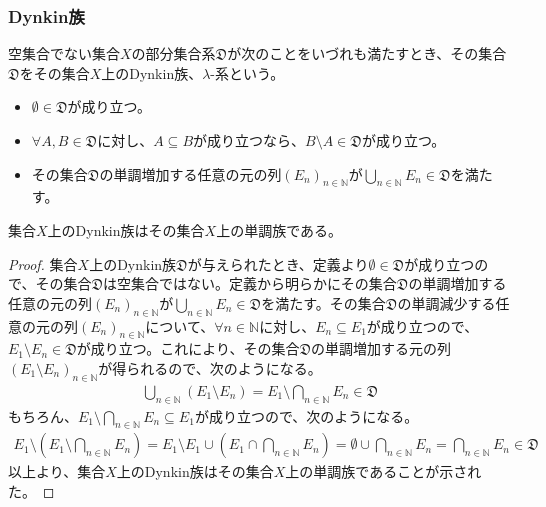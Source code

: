 \documentclass[dvipdfmx]{jsarticle}
\begin{document}
\subsubsection{Dynkin族}%
\begin{axs}[Dynkin族の公理]
空集合でない集合$X$の部分集合系$\mathfrak{D}$が次のことをいづれも満たすとき、その集合$\mathfrak{D}$をその集合$X$上のDynkin族、$\lambda$-系という。
\begin{itemize}
\item
  $\mathfrak{\emptyset \in D}$が成り立つ。
\item
  $\forall A,B\in \mathfrak{D}$に対し、$A \subseteq B$が成り立つなら、$B \setminus A\in \mathfrak{D}$が成り立つ。
\item
  その集合$\mathfrak{D}$の単調増加する任意の元の列$\left( E_{n} \right)_{n \in \mathbb{N}}$が$\bigcup_{n \in \mathbb{N}} E_{n} \in \mathfrak{D}$を満たす。
\end{itemize}
\end{axs}
\begin{thm}\label{4.5.6.9} 集合$X$上のDynkin族はその集合$X$上の単調族である。
\end{thm}
\begin{proof}
集合$X$上のDynkin族$\mathfrak{D}$が与えられたとき、定義より$\mathfrak{\emptyset \in D}$が成り立つので、その集合$\mathfrak{D}$は空集合ではない。定義から明らかにその集合$\mathfrak{D}$の単調増加する任意の元の列$\left( E_{n} \right)_{n \in \mathbb{N}}$が$\bigcup_{n \in \mathbb{N}} E_{n}\in \mathfrak{D}$を満たす。その集合$\mathfrak{D}$の単調減少する任意の元の列$\left( E_{n} \right)_{n \in \mathbb{N}}$について、$\forall n \in \mathbb{N}$に対し、$E_{n} \subseteq E_{1}$が成り立つので、$E_{1} \setminus E_{n}\in \mathfrak{D}$が成り立つ。これにより、その集合$\mathfrak{D}$の単調増加する元の列$\left( E_{1} \setminus E_{n} \right)_{n \in \mathbb{N}}$が得られるので、次のようになる。
\begin{align*}
\bigcup_{n \in \mathbb{N}} \left( E_{1} \setminus E_{n} \right) = E_{1} \setminus \bigcap_{n \in \mathbb{N}} E_{n}\in \mathfrak{D}
\end{align*}
もちろん、$E_{1} \setminus \bigcap_{n \in \mathbb{N}} E_{n} \subseteq E_{1}$が成り立つので、次のようになる。
\begin{align*}
E_{1} \setminus \left( E_{1} \setminus \bigcap_{n \in \mathbb{N}} E_{n} \right) = E_{1} \setminus E_{1} \cup \left( E_{1} \cap \bigcap_{n \in \mathbb{N}} E_{n} \right) = \emptyset \cup \bigcap_{n \in \mathbb{N}} E_{n} = \bigcap_{n \in \mathbb{N}} E_{n}\in \mathfrak{D}
\end{align*}
以上より、集合$X$上のDynkin族はその集合$X$上の単調族であることが示された。
\end{proof}
\end{document}
